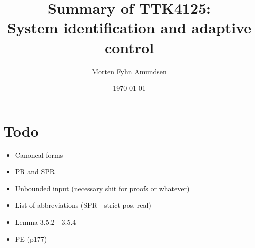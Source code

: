 \documentclass[a4paper]{article}
\title{Summary of TTK4125:\\System identification and adaptive control}
\author{Morten Fyhn Amundsen}
\date{\today}
\begin{document}
\maketitle
\tableofcontents

\section{Todo}
\begin{itemize}
	\item Canoncal forms
	\item PR and SPR
	\item Unbounded input (necessary shit for proofs or whatever)
	\item List of abbreviations (SPR - strict pos. real)
	\item Lemma 3.5.2 - 3.5.4
	\item PE (p177)
\end{itemize}







\end{document}
